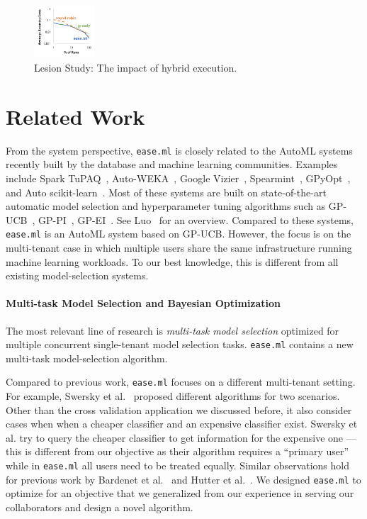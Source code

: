 \documentclass[letterpaper]{vldb}
\newcommand{\eml}{\texttt{ease.ml}\xspace}
\begin{document}
\begin{figure}[t!]
\centering
\includegraphics[width=0.2\textwidth]{figures/classifier_hybrid}
\vspace{-2em}
\caption{Lesion Study: The impact of hybrid execution.}
\label{fig:hybrid-exec}
\vspace{-1em}
\end{figure}

\section{Related Work}\label{sec:relatedwork}

\vspace{-0.5em}
From the system perspective, \eml is closely related to the
AutoML systems recently built by the database and machine learning communities.
Examples include Spark TuPAQ~\cite{Sparks2015}, Auto-WEKA~\cite{Thornton2013,Kotthoff2017}, 
Google Vizier~\cite{Golovin2017}, Spearmint~\cite{Snoek2012}, GPyOpt~\cite{gpyopt2016},
and Auto scikit-learn~\cite{Feurer2015}. Most of these systems
are built on state-of-the-art automatic model selection and 
hyperparameter tuning algorithms such as GP-UCB~\cite{SrinivasKKS10},
GP-PI~\cite{Kushner1964}, GP-EI~\cite{SnoekLA12}.
See Luo~\cite{Luo16} for an overview.
Compared to these systems, \eml is an AutoML system based on GP-UCB. However, the focus is
on the multi-tenant case in which multiple users share the same
infrastructure running machine learning workloads. To our best knowledge,
this is different from all existing model-selection systems.

\vspace{-1em}
\paragraph*{Multi-task Model Selection and Bayesian Optimization} 
The most relevant line of research is {\em multi-task model selection}
optimized for multiple concurrent single-tenant model selection tasks.
\eml contains a new multi-task model-selection algorithm. 

Compared to previous work, \eml focuses
on a different multi-tenant setting. For example, Swersky et al.~\cite{Swersky2013}
proposed different algorithms for two scenarios. 
Other than the cross validation application we discussed before,
it also consider cases when
when a cheaper classifier and an expensive classifier exist.
Swersky et al.
try to query the cheaper classifier to get information
for the expensive one --- this is different from our objective
as their algorithm requires a ``primary user'' while in \eml
all users need to be treated equally. Similar observations
hold for previous work by Bardenet et al.~\cite{Bardenet2013} and Hutter et al.~\cite{Hutter2011}.
We designed \eml to optimize for an objective
that we generalized from our experience in serving our collaborators
and design a novel algorithm. 
\end{document}
